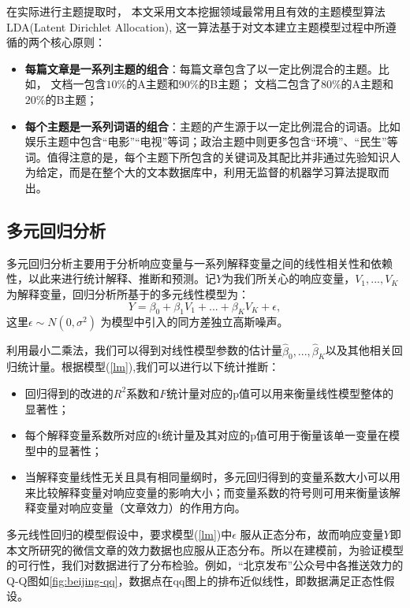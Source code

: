 \documentclass[a4paper,12pt,UTF8]{article}
\begin{document}
    在实际进行主题提取时， 本文采用文本挖掘领域最常用且有效的主题模型算法LDA(Latent Dirichlet Allocation), 这一算法基于对文本建立主题模型过程中所遵循的两个核心原则：
    
    \begin{itemize}
      \item \textbf{每篇文章是一系列主题的组合}：每篇文章包含了以一定比例混合的主题。比如， 文档一包含$10\%$的A主题和$90\%$的B主题； 文档二包含了$80\%$的A主题和$20\%$的B主题；
      \item \textbf{每个主题是一系列词语的组合}：主题的产生源于以一定比例混合的词语。比如
      娱乐主题中包含“电影”“电视”等词；政治主题中则更多包含“环境”、“民生”等词。值得注意的是，每个主题下所包含的关键词及其配比并非通过先验知识人为给定，而是在整个大的文本数据库中，利用无监督的机器学习算法提取而出。
    \end{itemize}
    
    \subsection{多元回归分析}
    多元回归分析主要用于分析响应变量与一系列解释变量之间的线性相关性和依赖性，以此来进行统计解释、推断和预测。记$Y$为我们所关心的响应变量，$V_1,...,V_K$为解释变量，回归分析所基于的多元线性模型为：
    \begin{equation}\label{lm}
      Y = \beta_0+ \beta_1 V_1+...+\beta_K V_K +\epsilon,
    \end{equation}
    这里$\epsilon \sim N(0,\sigma^2)$ 为模型中引入的同方差独立高斯噪声。
    
    利用最小二乘法，我们可以得到对线性模型参数的估计量$\hat\beta_0,...,\hat\beta_K$以及其他相关回归统计量。根据模型(\ref{lm}),我们可以进行以下统计推断：
    \begin{itemize}
      \item 回归得到的改进的$R^2$系数和$F$统计量对应的p值可以用来衡量线性模型整体的显著性；
      \item 每个解释变量系数所对应的t统计量及其对应的p值可用于衡量该单一变量在模型中的显著性；
      \item 当解释变量线性无关且具有相同量纲时，多元回归得到的变量系数大小可以用来比较解释变量对响应变量的影响大小；而变量系数的符号则可用来衡量该解释变量对响应变量（文章效力）的作用方向。
    \end{itemize}

    多元线性回归的模型假设中，要求模型(\ref{lm})中$\epsilon$ 服从正态分布，故而响应变量$Y$即本文所研究的微信文章的效力数据也应服从正态分布。所以在建模前，为验证模型的可行性，我们对数据进行了分布检验。例如，“北京发布”公众号中各推送效力的Q-Q图如\cref{fig:beijing-qq}，数据点在qq图上的排布近似线性，即数据满足正态性假设。
\end{document}

